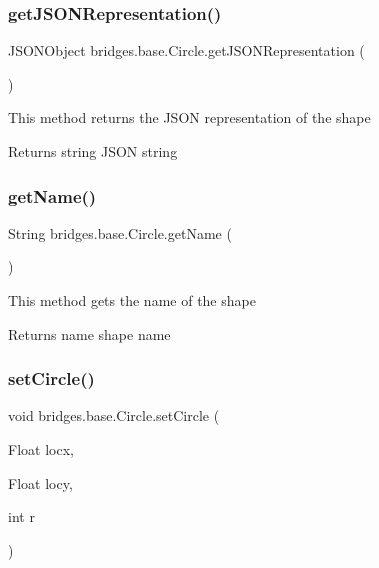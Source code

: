 \subsubsection{\texorpdfstring{get\+J\+S\+O\+N\+Representation()}{getJSONRepresentation()}}
{\footnotesize\ttfamily J\+S\+O\+N\+Object bridges.\+base.\+Circle.\+get\+J\+S\+O\+N\+Representation (\begin{DoxyParamCaption}{ }\end{DoxyParamCaption})}

This method returns the J\+S\+ON representation of the shape

\begin{DoxyReturn}{Returns}
string J\+S\+ON string 
\end{DoxyReturn}
\mbox{\label{classbridges_1_1base_1_1_circle_a3782ea68f0419747c00bd8b2bfa31462}} 
\subsubsection{\texorpdfstring{get\+Name()}{getName()}}
{\footnotesize\ttfamily String bridges.\+base.\+Circle.\+get\+Name (\begin{DoxyParamCaption}{ }\end{DoxyParamCaption})}

This method gets the name of the shape

\begin{DoxyReturn}{Returns}
name shape name 
\end{DoxyReturn}
\mbox{\label{classbridges_1_1base_1_1_circle_ab8c228507cbf3067c40d74e35563d1cf}} 
\subsubsection{\texorpdfstring{set\+Circle()}{setCircle()}}
{\footnotesize\ttfamily void bridges.\+base.\+Circle.\+set\+Circle (\begin{DoxyParamCaption}\item[{Float}]{locx,  }\item[{Float}]{locy,  }\item[{int}]{r }\end{DoxyParamCaption})}

